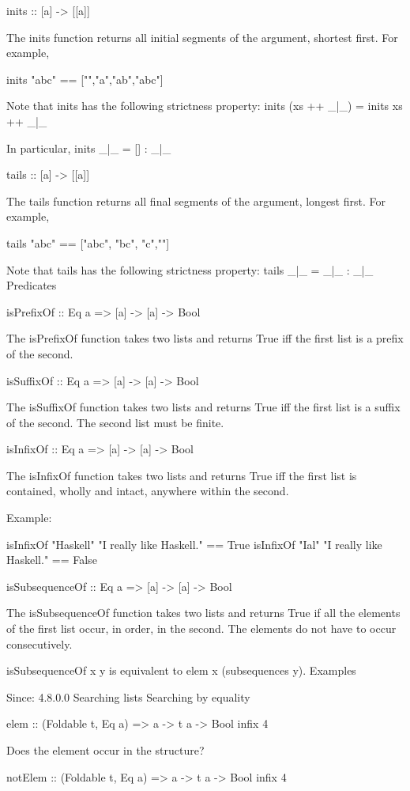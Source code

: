 inits :: [a] -> [[a]]

The inits function returns all initial segments of the argument, shortest first. For example,

inits "abc" == ["","a","ab","abc"]

Note that inits has the following strictness property: inits (xs ++ \_|\_) = inits xs ++ \_|\_

In particular, inits \_|\_ = [] : \_|\_

tails :: [a] -> [[a]]

The tails function returns all final segments of the argument, longest first. For example,

tails "abc" == ["abc", "bc", "c",""]

Note that tails has the following strictness property: tails \_|\_ = \_|\_ : \_|\_
Predicates

isPrefixOf :: Eq a => [a] -> [a] -> Bool

The isPrefixOf function takes two lists and returns True iff the first list is a prefix of the second.

isSuffixOf :: Eq a => [a] -> [a] -> Bool

The isSuffixOf function takes two lists and returns True iff the first list is a suffix of the second. The second list must be finite.

isInfixOf :: Eq a => [a] -> [a] -> Bool

The isInfixOf function takes two lists and returns True iff the first list is contained, wholly and intact, anywhere within the second.

Example:

isInfixOf "Haskell" "I really like Haskell." == True
isInfixOf "Ial" "I really like Haskell." == False

isSubsequenceOf :: Eq a => [a] -> [a] -> Bool

The isSubsequenceOf function takes two lists and returns True if all the elements of the first list occur, in order, in the second. The elements do not have to occur consecutively.

isSubsequenceOf x y is equivalent to elem x (subsequences y).
Examples

Since: 4.8.0.0
Searching lists
Searching by equality

elem :: (Foldable t, Eq a) => a -> t a -> Bool infix 4

Does the element occur in the structure?

notElem :: (Foldable t, Eq a) => a -> t a -> Bool infix 4

